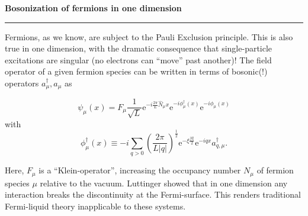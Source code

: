

\begin{frame}
    \begin{block}{\color{white}\textbf{\Large{
                    Bosonization of fermions in one dimension
                }}}
        \vspace{-10pt}\rule{\textwidth}{0.5pt}
        \color{white}
        Fermions, as we know, are subject to the Pauli Exclusion principle.
        This is also true in one dimension, with the dramatic consequence that single-particle excitations are singular (no electrons can  ``move'' past another)!
        The field operator of a given fermion species can be written in terms of bosonic(!) operators $a_\mu^\dagger, a_\mu$ as
    \end{block}
    \vspace*{-13pt}
    \[ \psi_{\mu}(x) = F_{\mu} \frac{1}{\sqrt{L}}\mathrm{e}^{-i\frac{2\pi}{L}\hat{N}_{\mu}x}\mathrm{e}^{-i\phi_{\mu}^{\dagger}(x)}\mathrm{e}^{-i\phi_{\mu}(x)} \]
    with
    \[ \phi_{\mu}^{\dagger}(x) \equiv -i\sum_{q>0}\left (\frac{2\pi}{L|q|}\right )^{\frac12}\mathrm{e}^{-\xi\frac{|q|}{2}}\mathrm{e}^{-iqx}a_{q,\mu}^{\dagger}. \]

    \vspace*{-5pt}
    \begin{block}{}
        \color{white}
        Here, $F_\mu$ is a ``Klein-operator'', increasing the occupancy number $N
            _\mu$ of fermion species $\mu$ relative to the vacuum. Luttinger showed that in one dimension any interaction breaks the discontinuity at the Fermi-surface. This renders traditional Fermi-liquid theory inapplicable to these systems.
    \end{block}
\end{frame}
